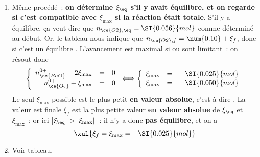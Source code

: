 \documentclass[../../main/main.tex]{subfiles}
\begin{document}
{\begin{enumerate}[leftmargin=20pt, label=\alph* --]
\begin{tcb}
		      \end{tcb}
		\item Même procédé~: \textbf{on détermine $\xi_{\eq}$ s'il y
			      avait équilibre, et on regarde si c'est compatible avec
			      $\xi_{\max}$ si la réaction était totale}.
            \bigbreak
		      S'il y a équilibre, ça veut dire que $n_{\ce{O2}, \eq} =
			      \SI{0.056}{mol}$ comme déterminé au début. Or, le tableau nous
		      indique que $n_{\ce{O2}, f} = \num{0.10} + \xi_f$, donc si c'est
		      un équilibre .
          \bigbreak
		      L'avancement est maximal si  ou  sont limitant~:
		      on résout donc
		      \begin{gather*}
			      \left\{
			      \begin{array}{rcl}
				      n_{\ce{BaO}}^{0+}+2\xi_{\max} & = & 0 \\
				      n_{\ce{O_2}}^{0+}+\xi_{\max}  & = & 0
			      \end{array}
			      \right.
			      \Longleftrightarrow
			      \left\{
			      \begin{array}{rcl}
				      \xi_{\max} & = & -\SI{0.025}{mol} \\
				      \xi_{\max} & = & -\SI{0.050}{mol}
			      \end{array}
			      \right.
		      \end{gather*}
		      Le seul $\xi_{\max}$ possible est le plus petit \textbf{en
			      valeur absolue}, c'est-à-dire .
              \bigbreak
          La valeur est finale $\xi_f$ est la plus petite valeur \textbf{en
          valeur absolue} de $\xi_{\eq}$ et $\xi_{\max}$~; or ici
          $\abs{\xi_{\eq}} > \abs{\xi_{\max}}$~: il n'y a donc \textbf{pas
          équilibre}, et on a
		      \[\xul{\xi_f = \xi_{\max} = -\SI{0.025}{mol}}\]
		\item Voir tableau.
	\end{enumerate}
}
\end{document}
